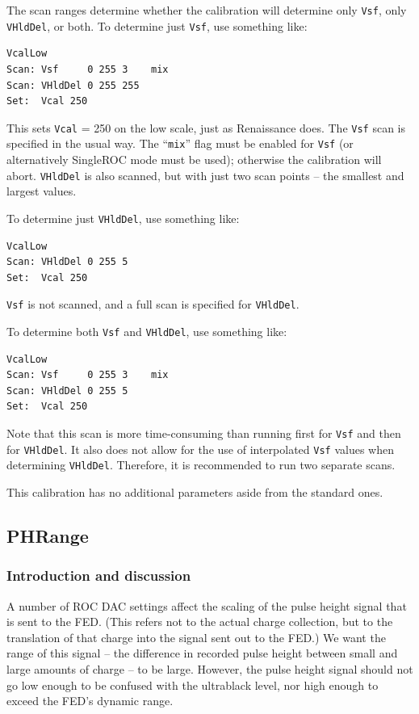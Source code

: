 The scan ranges determine whether the calibration will determine only \verb|Vsf|, only \verb|VHldDel|, or both.  To determine just \verb|Vsf|, use something like:
\begin{verbatim}
VcalLow
Scan: Vsf     0 255 3    mix
Scan: VHldDel 0 255 255
Set:  Vcal 250
\end{verbatim}
This sets \verb|Vcal| = 250 on the low scale, just as Renaissance does.  The \verb|Vsf| scan is specified in the usual way.  The ``\verb|mix|'' flag must be enabled for \verb|Vsf| (or alternatively SingleROC mode must be used); otherwise the calibration will abort.  \verb|VHldDel| is also scanned, but with just two scan points -- the smallest and largest values.

To determine just \verb|VHldDel|, use something like:
\begin{verbatim}
VcalLow
Scan: VHldDel 0 255 5
Set:  Vcal 250
\end{verbatim}
\verb|Vsf| is not scanned, and a full scan is specified for \verb|VHldDel|.

To determine both \verb|Vsf| and \verb|VHldDel|, use something like:
\begin{verbatim}
VcalLow
Scan: Vsf     0 255 3    mix
Scan: VHldDel 0 255 5
Set:  Vcal 250
\end{verbatim}
Note that this scan is more time-consuming than running first for \verb|Vsf| and then for \verb|VHldDel|.  It also does not allow for the use of interpolated \verb|Vsf| values when determining \verb|VHldDel|.  Therefore, it is recommended to run two separate scans.

This calibration has no additional parameters aside from the standard ones.


\subsection{PHRange}

\subsubsection{Introduction and discussion}

A number of ROC DAC settings affect the scaling of the pulse height signal that is sent to the FED.  (This refers not to the actual charge collection, but to the translation of that charge into the signal sent out to the FED.)  We want the range of this signal -- the difference in recorded pulse height between small and large amounts of charge -- to be large.  However, the pulse height signal should not go low enough to be confused with the ultrablack level, nor high enough to exceed the FED's dynamic range.


